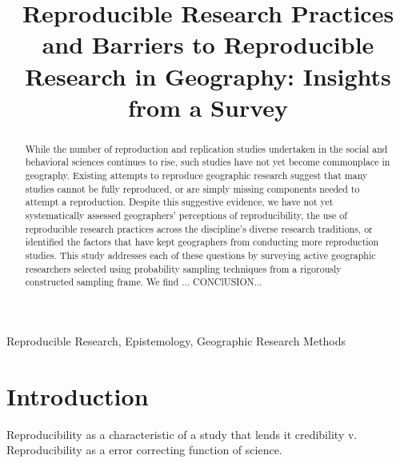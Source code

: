 \documentclass[]{interact}
\theoremstyle{plain}%
\theoremstyle{definition}
\theoremstyle{remark}
\begin{document}

\title{Reproducible Research Practices and Barriers to Reproducible Research in Geography: Insights from a Survey}

\author{
}

\maketitle

\begin{abstract}
While the number of reproduction and replication studies undertaken in the social and behavioral sciences continues to rise, such studies have not yet become commonplace in geography. 
Existing attempts to reproduce geographic research suggest that many studies cannot be fully reproduced, or are simply missing components needed to attempt a reproduction. 
Despite this suggestive evidence, we have not yet systematically assessed geographers' perceptions of reproducibility, the use of reproducible research practices across the discipline's diverse research traditions, or identified the factors that have kept geographers from conducting more reproduction studies.
This study addresses each of these questions by surveying active geographic researchers selected using probability sampling techniques from a rigorously constructed sampling frame.
We find ...
CONClUSION...

\end{abstract}

\begin{keywords}
Reproducible Research, Epistemology, Geographic Research Methods
\end{keywords}

\section*{Introduction}
Reproducibility as a characteristic of a study that lends it credibility v. Reproducibility as a error correcting function of science. 
\end{document}
